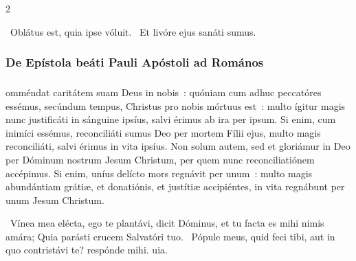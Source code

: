 \documentclass[9pt,twoside]{extarticle}
\begin{document}
\begin{multicols}{2}
%
%
%
%
%
%
%
%
%
%
%
%

\begin{tightlist}{}
\item {}~Oblátus est, quia ipse vóluit. ~Et livóre ejus sanáti sumus.
\end{tightlist}

\subsubsection*{\center De Epístola beáti Pauli Apóstoli ad Romános}
\subsubsection*{\center {}}
omméndat caritátem suam Deus in nobis~: quóniam cum adhuc peccatóres essémus, secúndum tempus, Christus pro nobis mórtuus est~: multo ígitur magis nunc justificáti in sánguine ipsíus, salvi érimus ab ira per ipsum. Si enim, cum inimíci essémus, reconciliáti sumus Deo per mortem Fílii ejus, multo magis reconciliáti, salvi érimus in vita ipsíus. Non solum autem, sed et gloriámur in Deo per Dóminum nostrum Jesum Christum, per quem nunc reconciliatiónem accépimus. Si enim, uníus delícto mors regnávit per unum~: multo magis abundántiam grátiæ, et donatiónis, et justítiæ accipiéntes, in vita regnábunt per unum Jesum Christum.

\begin{tightlist}{}
\item {}~Vínea mea elécta, ego te plantávi, dicit Dóminus, et tu facta es mihi nimis amára; \textred{*} Quia parásti crucem Salvatóri tuo. ~Pópule meus, quid feci tibi, aut in quo contristávi te? respónde mihi. uia.
\end{tightlist}


\end{multicols}
\end{document}
